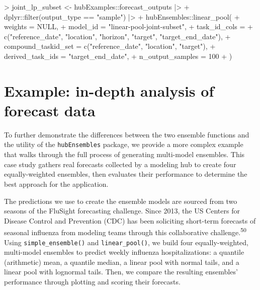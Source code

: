 \documentclass[
]{article}
\newenvironment{Shaded}{\begin{snugshade}}{\end{snugshade}}
\newcommand{\AttributeTok}[1]{\textcolor[rgb]{0.40,0.45,0.13}{#1}}
\newcommand{\ConstantTok}[1]{\textcolor[rgb]{0.56,0.35,0.01}{#1}}
\newcommand{\DecValTok}[1]{\textcolor[rgb]{0.68,0.00,0.00}{#1}}
\newcommand{\FunctionTok}[1]{\textcolor[rgb]{0.28,0.35,0.67}{#1}}
\newcommand{\NormalTok}[1]{\textcolor[rgb]{0.00,0.23,0.31}{#1}}
\newcommand{\OtherTok}[1]{\textcolor[rgb]{0.00,0.23,0.31}{#1}}
\newcommand{\SpecialCharTok}[1]{\textcolor[rgb]{0.37,0.37,0.37}{#1}}
\newcommand{\StringTok}[1]{\textcolor[rgb]{0.13,0.47,0.30}{#1}}
\begin{document}
\begin{Shaded}
\begin{Highlighting}[]
\SpecialCharTok{\textgreater{}}\NormalTok{ joint\_lp\_subset }\OtherTok{\textless{}{-}}\NormalTok{ hubExamples}\SpecialCharTok{::}\NormalTok{forecast\_outputs }\SpecialCharTok{|\textgreater{}}
\SpecialCharTok{+}\NormalTok{   dplyr}\SpecialCharTok{::}\FunctionTok{filter}\NormalTok{(output\_type }\SpecialCharTok{==} \StringTok{"sample"}\NormalTok{) }\SpecialCharTok{|\textgreater{}}
\SpecialCharTok{+}\NormalTok{   hubEnsembles}\SpecialCharTok{::}\FunctionTok{linear\_pool}\NormalTok{(}
\SpecialCharTok{+}     \AttributeTok{weights =} \ConstantTok{NULL}\NormalTok{,}
\SpecialCharTok{+}     \AttributeTok{model\_id =} \StringTok{"linear{-}pool{-}joint{-}subset"}\NormalTok{,}
\SpecialCharTok{+}     \AttributeTok{task\_id\_cols =}
\SpecialCharTok{+}       \FunctionTok{c}\NormalTok{(}\StringTok{"reference\_date"}\NormalTok{, }\StringTok{"location"}\NormalTok{, }\StringTok{"horizon"}\NormalTok{, }\StringTok{"target"}\NormalTok{, }\StringTok{"target\_end\_date"}\NormalTok{),}
\SpecialCharTok{+}     \AttributeTok{compound\_taskid\_set =} \FunctionTok{c}\NormalTok{(}\StringTok{"reference\_date"}\NormalTok{, }\StringTok{"location"}\NormalTok{, }\StringTok{"target"}\NormalTok{),}
\SpecialCharTok{+}     \AttributeTok{derived\_task\_ids =} \StringTok{"target\_end\_date"}\NormalTok{,}
\SpecialCharTok{+}     \AttributeTok{n\_output\_samples =} \DecValTok{100}
\SpecialCharTok{+}\NormalTok{   )}
\end{Highlighting}
\end{Shaded}

\section{Example: in-depth analysis of forecast
data}\label{sec-case-study}

To further demonstrate the differences between the two ensemble
functions and the utility of the \texttt{hubEnsembles} package, we
provide a more complex example that walks through the full process of
generating multi-model ensembles. This case study gathers real forecasts
collected by a modeling hub to create four equally-weighted ensembles,
then evaluates their performance to determine the best approach for the
application.

The predictions we use to create the ensemble models are sourced from
two seasons of the FluSight forecasting challenge. Since 2013, the US
Centers for Disease Control and Prevention (CDC) has been soliciting
short-term forecasts of seasonal influenza from modeling teams through
this collaborative challenge.\textsuperscript{50} Using
\texttt{simple\_ensemble()} and \texttt{linear\_pool()}, we build four
equally-weighted, multi-model ensembles to predict weekly influenza
hospitalizations: a quantile (arithmetic) mean, a quantile median, a
linear pool with normal tails, and a linear pool with lognormal tails.
Then, we compare the resulting ensembles' performance through plotting
and scoring their forecasts.
\end{document}
